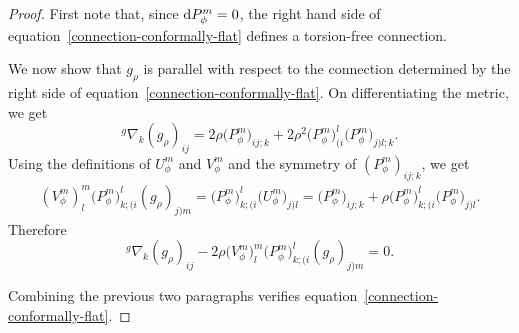 \documentclass[pdftex]{sigma}
\numberwithin{equation}{section}
\begin{document}
\begin{proof}
First note that, since ${\rm d}P_\phi^m=0$, the right hand side of equation~\eqref{connection-conformally-flat} defines a torsion-free connection.


We now show that $g_\rho$ is parallel with respect to the connection determined by the right side of equation~\eqref{connection-conformally-flat}. On differentiating the metric, we get
\begin{equation}\label{metric-differential}
^{g}\nabla_{k} (g_\rho)_{i j}=2 \rho \big(P_\phi^m\big)_{i j; k}+2 \rho^{2} \big(P_\phi^m\big)_{(i}^{l} \big(P_\phi^m\big)_{j) l; k}.
\end{equation}
Using the definitions of $U_\phi^m$ and $V_\phi^m$ and the symmetry of $(P_\phi^m)_{ij;k}$, we get
\begin{align*}
(V_\phi^m)_{l}^{m} \big(P_\phi^m\big)_{k;(i}^{l} (g_\rho)_{j) m}=\big(P_\phi^m\big)_{k;(i}^{l} \big(U_\phi^m\big)_{j) l}=\big(P_\phi^m\big)_{i j; k}+\rho \big(P_\phi^m\big)_{k;(i}^{l} \big(P_\phi^m\big)_{j) l}.
\end{align*}
Therefore
\[
{}^g\nabla_{k} (g_\rho)_{i j}-2\rho \big(V_\phi^m\big)_{l}^{m} \big(P_\phi^m\big)_{k;(i}^{l} (g_\rho)_{j) m}=0.
\]

Combining the previous two paragraphs verifies equation~\eqref{connection-conformally-flat}.


\end{proof}
\end{document}
